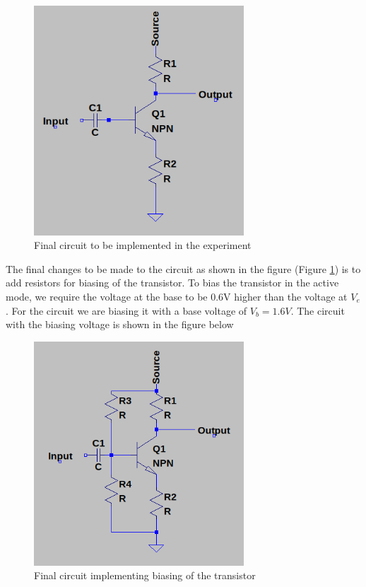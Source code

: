 \documentclass[12pt, a4paper]{article}
\begin{document}
 	\begin{figure}[H]
 		\centering
		\includegraphics[width=0.7\textwidth]{images/final_transistor_circuit.png}
		\caption{Final circuit to be implemented in the experiment}
		\label{fig:final_transistor_circuit}
 	\end{figure}

 	The final changes to be made to the circuit as shown in the figure (Figure \ref{fig:final_transistor_circuit}) is to add resistors for biasing of the transistor. To bias the transistor in the active mode, we require the voltage at the base to be 0.6V higher than the voltage at $V_e$. For the circuit we are biasing it with a base voltage of $V_b = 1.6V$. The circuit with the biasing voltage is shown in the figure below 

 	\begin{figure}[H]
 		\centering
		\includegraphics[width=0.7\textwidth]{images/biasing_transistor_circuit.png}
		\caption{Final circuit implementing biasing of the transistor}
		\label{fig:biasing_transistor}
 	\end{figure}
\end{document}
